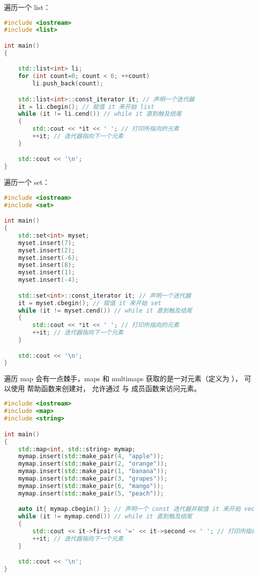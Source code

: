 \documentclass[../../LearnCpp.tex]{subfiles}
\begin{document}
遍历一个 list：

\begin{lstlisting}[language=C++]
#include <iostream>
#include <list>

int main()
{

    std::list<int> li;
    for (int count=0; count < 6; ++count)
        li.push_back(count);

    std::list<int>::const_iterator it; // 声明一个迭代器
    it = li.cbegin(); // 赋值 it 来开始 list
    while (it != li.cend()) // while it 直到触及结尾
    {
        std::cout << *it << ' '; // 打印所指向的元素
        ++it; // 迭代器指向下一个元素
    }

    std::cout << '\n';
}
\end{lstlisting}

遍历一个 set：

\begin{lstlisting}[language=C++]
#include <iostream>
#include <set>

int main()
{
    std::set<int> myset;
    myset.insert(7);
    myset.insert(2);
    myset.insert(-6);
    myset.insert(8);
    myset.insert(1);
    myset.insert(-4);

    std::set<int>::const_iterator it; // 声明一个迭代器
    it = myset.cbegin(); // 赋值 it 来开始 set
    while (it != myset.cend()) // while it 直到触及结尾
    {
        std::cout << *it << ' '; // 打印所指向的元素
        ++it; // 迭代器指向下一个元素
    }

    std::cout << '\n';
}
\end{lstlisting}

遍历 map 会有一点棘手，maps 和 multimaps 获取的是一对元素（定义为 ），
可以使用  帮助函数来创建对，
 允许通过  与  成员函数来访问元素。

\begin{lstlisting}[language=C++]
#include <iostream>
#include <map>
#include <string>

int main()
{
    std::map<int, std::string> mymap;
    mymap.insert(std::make_pair(4, "apple"));
    mymap.insert(std::make_pair(2, "orange"));
    mymap.insert(std::make_pair(1, "banana"));
    mymap.insert(std::make_pair(3, "grapes"));
    mymap.insert(std::make_pair(6, "mango"));
    mymap.insert(std::make_pair(5, "peach"));

    auto it{ mymap.cbegin() }; // 声明一个 const 迭代器并赋值 it 来开始 vector
    while (it != mymap.cend()) // while it 直到触及结尾
    {
        std::cout << it->first << '=' << it->second << ' '; // 打印所指向的元素
        ++it; // 迭代器指向下一个元素
    }

    std::cout << '\n';
}
\end{lstlisting}
\end{document}
